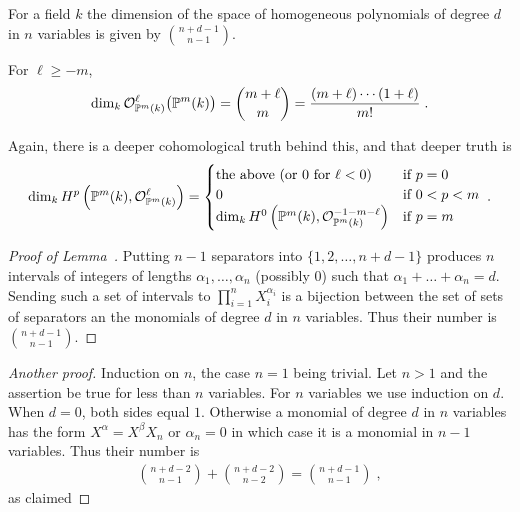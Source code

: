 \documentclass[a4paper,parskip=half,numbers=enddot, DIV=12, headheight=30pt]{scrreprt}
\begin{document}
\begin{lem}
    For a field $k$ the dimension of the space of homogeneous polynomials of degree $d$ in $n$ variables is given by $\binom{n+d-1}{n-1}$.
\end{lem}
\begin{cor}
	For $\ell\geq -m$,
    \begin{align*}
        \dim_k\mathcal{O}_{\mathbb{P}^m(k)}^\ell\big(\mathbb{P}^m(k)\big) = \binom{m+\ell}{m} = \frac{(m+\ell)\cdots (1+\ell)}{m!}\;.
    \end{align*}
\end{cor}
\begin{rem*}
	Again, there is a deeper cohomological truth behind this, and that deeper truth is
	\begin{align*}
		\dim_kH^p\left(\mathbb{P}^m(k),\mathcal{O}_{\mathbb{P}^m(k)}^\ell\right)=
		\begin{cases}
			\text{the above (or $0$ for $\ell<0$)} & \text{if }p=0\\
			0 & \text{if }0<p<m\\
			\dim_kH^0\left(\mathbb{P}^m(k),\mathcal{O}_{\mathbb{P}^m(k)}^{-1-m-\ell}\right) & \text{if }p=m
		\end{cases}\;.
	\end{align*}
\end{rem*}
\begin{proof}[Proof of Lemma~]
    Putting $n-1$ separators into $\{1,2,\ldots,n+d-1\}$ produces $n$ intervals of integers of lengths $\alpha_1,\ldots,\alpha_n$ (possibly $0$) such that $\alpha_1+\ldots+\alpha_n=d$. Sending such a set of intervals to $\prod_{i=1}^n X_i^{\alpha_i}$ is a bijection between the set of sets of separators an the monomials of degree $d$ in $n$ variables. Thus their number is $\binom{n+d-1}{n-1}$.
\end{proof}
\begin{proof}[Another proof]
    Induction on $n$, the case $n=1$ being trivial. Let $n>1$ and the assertion be true for less than $n$ variables. For $n$ variables we use induction on $d$. When $d=0$, both sides equal $1$. Otherwise a monomial of degree $d$ in $n$ variables has the form $X^\alpha = X^\beta X_n$ or $\alpha_n= 0$ in which case it is a monomial in $n-1$ variables. Thus their number is 
    \begin{align*}
         \binom{n+d-2}{n-1} +\binom{n+d-2}{n-2} = \binom{n+d-1}{n-1}\;,
    \end{align*}
    as claimed
\end{proof}
\end{document}
